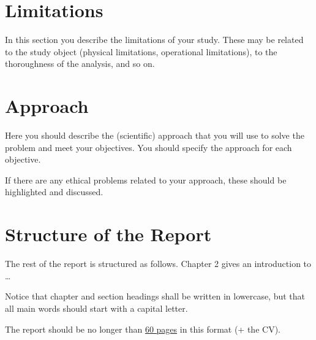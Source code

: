 \section{Limitations}
In this section you describe the limitations of your study. These may be related to the study object (physical limitations, operational limitations), to the thoroughness of the analysis, and so on.
\section{Approach}
Here you should describe the (scientific) approach that you will use to solve the problem and meet your objectives. You should specify the approach for each objective.

If there are any ethical problems related to your approach, these should be highlighted and discussed.
\section{Structure of the Report}
The rest of the report is structured as follows. Chapter 2 gives an introduction to \ldots

\begin{remark}
Notice that chapter and section headings shall be written in lowercase, but that all main words should start with a capital letter.
\end{remark}


The report should be no longer than \underline{60 pages} in this format (+ the CV).
